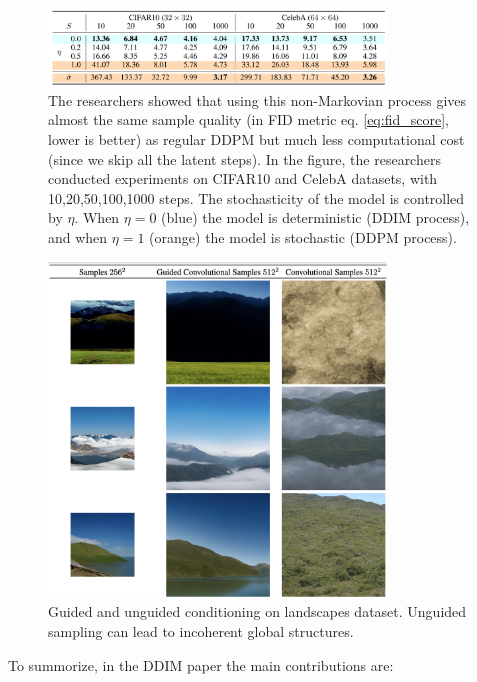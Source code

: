 \begin{figure}
    \centering
    \includegraphics[width=0.8\textwidth]{images/diffusion_models/stable_diffusion/ddim_sample_quality.png}
    \caption{The researchers showed that using this non-Markovian process gives almost the same sample quality (in FID metric eq. \ref{eq:fid_score}, lower is better) as regular DDPM but much less computational cost (since we skip all the latent steps). In the figure, the researchers conducted experiments on CIFAR10 and CelebA datasets, with 10,20,50,100,1000 steps. The stochasticity of the model is controlled by $\eta$. When $\eta = 0$ (blue) the model is deterministic (DDIM process), and when $\eta = 1$ (orange) the model is stochastic (DDPM process).}
\end{figure}

\begin{figure}
    \centering
    \includegraphics[width=0.8\textwidth]{images/diffusion_models/stable_diffusion/guided_conditioning.png}
    \caption{Guided and unguided conditioning on landscapes dataset. Unguided sampling can lead to incoherent global structures.}
\end{figure}

To summorize, in the DDIM paper \cite{ddim} the main contributions are:

